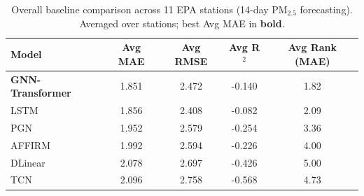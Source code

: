 \begin{table}[t]
\centering
\caption{Overall baseline comparison across 11 EPA stations (14-day PM$_{2.5}$ forecasting). Averaged over stations; best Avg MAE in \textbf{bold}.}
\label{tab:baseline-summary}
\begin{tabular}{lcccc}
\toprule
Model & Avg MAE & Avg RMSE & Avg R$^2$ & Avg Rank (MAE) \\
\midrule
\textbf{GNN-Transformer} & 1.851 & 2.472 & -0.140 & 1.82 \\
LSTM & 1.856 & 2.408 & -0.082 & 2.09 \\
PGN & 1.952 & 2.579 & -0.254 & 3.36 \\
AFFIRM & 1.992 & 2.594 & -0.226 & 4.00 \\
DLinear & 2.078 & 2.697 & -0.426 & 5.00 \\
TCN & 2.096 & 2.758 & -0.568 & 4.73 \\
\bottomrule
\end{tabular}
\end{table}
